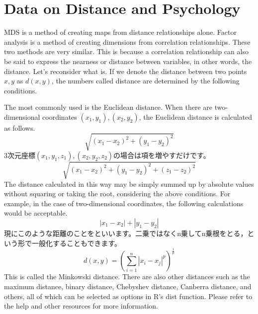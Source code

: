 \documentclass{ltjsbook}
\begin{document}
\section{Data on Distance and Psychology}
\label{distance}
MDS is a method of creating maps from distance relationships alone. Factor analysis is a method of creating dimensions from correlation relationships. These two methods are very similar. This is because a correlation relationship can also be said to express the nearness or distance between variables, in other words, the distance.
Let's reconsider what  is. If we denote the distance between two points $x, y$ as $d(x, y)$, the numbers called distance are determined by the following conditions.

The most commonly used is the Euclidean distance. When there are two-dimensional coordinates $(x_1,y_1),(x_2,y_2)$, the Euclidean distance is calculated as follows.
\[ \sqrt{(x_1-x_2)^2+(y_1-y_2)^2} \]
3次元座標$(x_1,y_1,z_1),(x_2,y_2,z_2)$の場合は項を増やすだけです。
\[ \sqrt{(x_1-x_2)^2+(y_1-y_2)^2+(z_1-z_2)^2} \]
The distance calculated in this way may be simply summed up by absolute values without squaring or taking the root, considering the above conditions. For example, in the case of two-dimensional coordinates, the following calculations would be acceptable.
\[ |x_1-x_2|+|y_1-y_2| \]
現にこのような距離のことをといいます。二乗ではなくn乗してn乗根をとる，という形で一般化することもできます。
\[ d(x,y) = \left( \sum_{i=1}^n |x_i - x_j|^p\right)^{\frac{1}{p}} \]
This is called the Minkowski distance. There are also other distances such as the maximum distance, binary distance, Chebyshev distance, Canberra distance, and others, all of which can be selected as options in R's dist function. Please refer to the help and other resources for more information.
\end{document}
